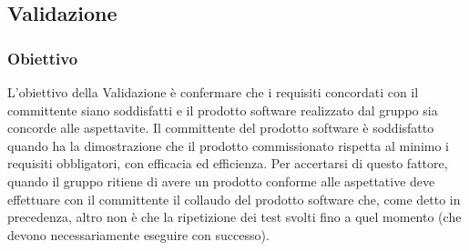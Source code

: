 \subsection{Validazione}
\subsubsection{Obiettivo}
L’obiettivo della Validazione è confermare che i requisiti concordati con il committente siano soddisfatti e il prodotto software realizzato dal gruppo sia concorde alle aspettavite.
Il committente del prodotto software è soddisfatto quando ha la dimostrazione che il prodotto commissionato rispetta al minimo i requisiti obbligatori, con efficacia ed efficienza.
Per accertarsi di questo fattore, quando il gruppo ritiene di avere un prodotto conforme alle aspettative deve effettuare con il committente il collaudo del prodotto software che, come detto in precedenza, altro non è che la ripetizione dei test svolti fino a quel momento (che devono necessariamente eseguire con successo).

